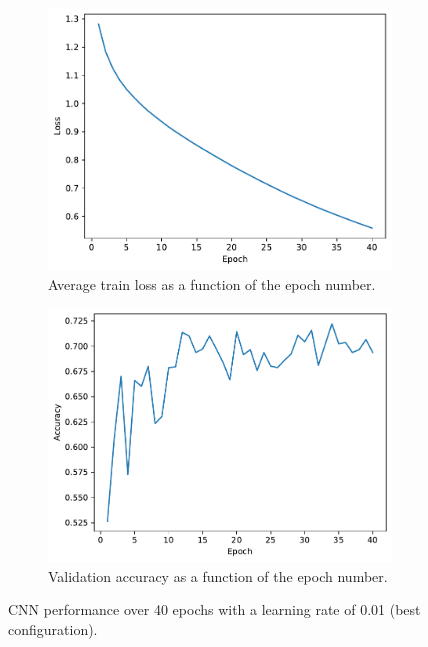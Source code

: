 \documentclass[a4paper, 12pt]{article}
\begin{document}
\begin{figure}[H]
    \centering
    \begin{subfigure}{0.45\linewidth}
        \centering
        \includegraphics[width=\linewidth]{plot/q2/CNN-3-train-loss-40-8-0.01-0-0.1-sgd-False-True-69.27.pdf}
        \caption{Average train loss as a function
of the epoch number.}
        \label{fig:loss_0.01}
    \end{subfigure}
    \hspace{0.05\linewidth}
    \begin{subfigure}{0.45\linewidth}
        \centering
        \includegraphics[width=\linewidth]{plot/q2/CNN-3-valid-accuracy-40-8-0.01-0-0.1-sgd-False-True-69.27.pdf}
        \caption{Validation accuracy as a function of the epoch number.}
        \label{fig:acc_0.01}
    \end{subfigure}
    \caption{CNN performance over 40 epochs with a learning rate of 0.01 (best configuration).}
    \label{fig:side-by-side1}
\end{figure}
\end{document}
